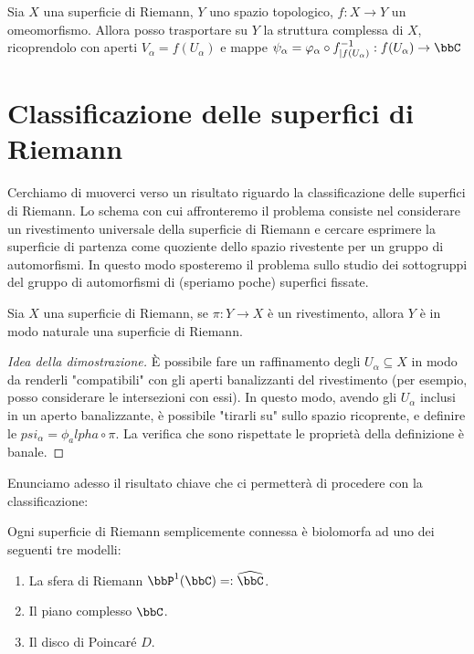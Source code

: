 \begin{osservazione}
Sia $X$ una superficie di Riemann, $Y$ uno spazio topologico, $f:X\rightarrow Y$ un omeomorfismo. Allora posso trasportare su $Y$ la struttura complessa di $X$, ricoprendolo con aperti $V_\alpha=f(U_\alpha)$ e mappe $\psi_\alpha=\varphi_\alpha \circ f^{-1}_{|f(U_\alpha)}:f(U_\alpha)\rightarrow\bbC$
\end{osservazione}


\section{Classificazione delle superfici di Riemann}
Cerchiamo di muoverci verso un risultato riguardo la classificazione delle superfici di Riemann. Lo schema con cui affronteremo il problema consiste nel considerare un rivestimento universale della superficie di Riemann e cercare esprimere la superficie di partenza come quoziente dello spazio rivestente per un gruppo di automorfismi. In questo modo sposteremo il problema sullo studio dei sottogruppi del gruppo di automorfismi di (speriamo poche) superfici fissate.
\begin{osservazione}
Sia $X$ una superficie di Riemann, se $\pi:Y\rightarrow X$ è un rivestimento, allora $Y$ è in modo naturale una superficie di Riemann.
\end{osservazione} 
\begin{proof}[Idea della dimostrazione]
È possibile fare un raffinamento degli $U_\alpha\subseteq X$ in modo da renderli "compatibili" con gli aperti banalizzanti del rivestimento (per esempio, posso considerare le intersezioni con essi). In questo modo, avendo gli $U_\alpha$ inclusi in un aperto banalizzante, è possibile "tirarli su" sullo spazio ricoprente, e definire le $psi_\alpha=\phi_alpha \circ \pi$. La verifica che sono rispettate le proprietà della definizione è banale.
\end{proof}
Enunciamo adesso il risultato chiave che ci permetterà di procedere con la classificazione:
\begin{teorema}[di Riemann]
Ogni superficie di Riemann semplicemente connessa è biolomorfa ad uno dei seguenti tre modelli:
\begin{enumerate}
  \item La sfera di Riemann $\bbP^1(\bbC)=:\widehat{\bbC}$.
  \item Il piano complesso $\bbC$.
  \item Il disco di Poincaré $D$.
\end{enumerate}
\end{teorema} 
